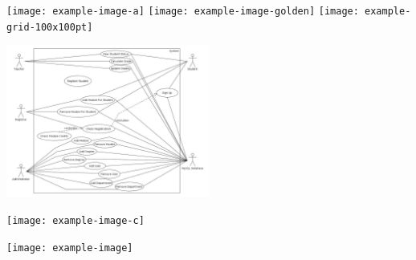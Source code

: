 \documentclass[12pt,a4paper]{article}
\begin{document}
\noindent\texttt{[image: example-image-a]}\qquad
\texttt{[image: example-image-golden]}\qquad
\texttt{[image: example-grid-100x100pt]}

\noindent\includegraphics[height=5cm]{uml1} 

\noindent\texttt{[image: example-image-c]} 

\noindent\texttt{[image: example-image]} 
\end{document}
